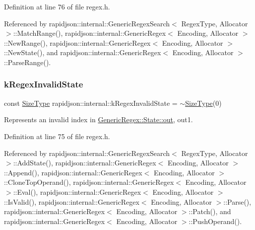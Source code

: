 Definition at line 76 of file regex.\+h.



Referenced by rapidjson\+::internal\+::\+Generic\+Regex\+Search$<$ Regex\+Type, Allocator $>$\+::\+Match\+Range(), rapidjson\+::internal\+::\+Generic\+Regex$<$ Encoding, Allocator $>$\+::\+New\+Range(), rapidjson\+::internal\+::\+Generic\+Regex$<$ Encoding, Allocator $>$\+::\+New\+State(), and rapidjson\+::internal\+::\+Generic\+Regex$<$ Encoding, Allocator $>$\+::\+Parse\+Range().

\mbox{\label{namespacerapidjson_1_1internal_a5e338a291ef3558dbba9ba6eb2b346ea}} 
\subsubsection{\texorpdfstring{kRegexInvalidState}{kRegexInvalidState}}
{\footnotesize\ttfamily const \mbox{\hyperlink{namespacerapidjson_a44eb33eaa523e36d466b1ced64b85c84}{Size\+Type}} rapidjson\+::internal\+::k\+Regex\+Invalid\+State = $\sim$\mbox{\hyperlink{namespacerapidjson_a44eb33eaa523e36d466b1ced64b85c84}{Size\+Type}}(0)\hspace{0.3cm}{\ttfamily [static]}}



Represents an invalid index in \mbox{\hyperlink{structrapidjson_1_1internal_1_1_generic_regex_1_1_state_a6df788d7a28b25c65a20068dfdbe2fe1}{Generic\+Regex\+::\+State\+::out}}, out1. 



Definition at line 75 of file regex.\+h.



Referenced by rapidjson\+::internal\+::\+Generic\+Regex\+Search$<$ Regex\+Type, Allocator $>$\+::\+Add\+State(), rapidjson\+::internal\+::\+Generic\+Regex$<$ Encoding, Allocator $>$\+::\+Append(), rapidjson\+::internal\+::\+Generic\+Regex$<$ Encoding, Allocator $>$\+::\+Clone\+Top\+Operand(), rapidjson\+::internal\+::\+Generic\+Regex$<$ Encoding, Allocator $>$\+::\+Eval(), rapidjson\+::internal\+::\+Generic\+Regex$<$ Encoding, Allocator $>$\+::\+Is\+Valid(), rapidjson\+::internal\+::\+Generic\+Regex$<$ Encoding, Allocator $>$\+::\+Parse(), rapidjson\+::internal\+::\+Generic\+Regex$<$ Encoding, Allocator $>$\+::\+Patch(), and rapidjson\+::internal\+::\+Generic\+Regex$<$ Encoding, Allocator $>$\+::\+Push\+Operand().

